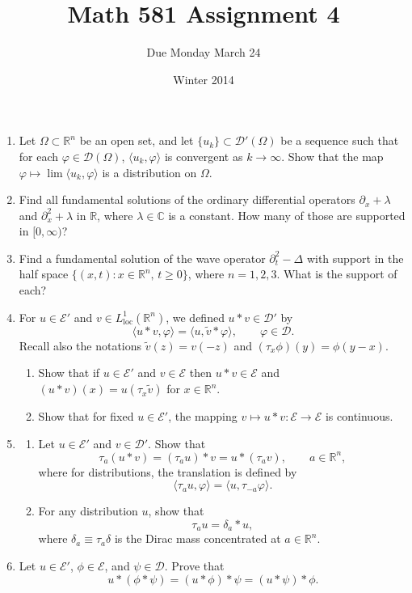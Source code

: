 \documentclass[11pt]{amsart}
\title{Math 581 Assignment 4}
\author{Due Monday March 24}
\date{Winter 2014}                                           %
\newcommand{\R}{\mathbb{R}}
\newcommand{\C}{\mathbb{C}}
\newcommand{\tstD}{\mathscr{D}}
\newcommand{\tstE}{\mathscr{E}}
\begin{document}
\maketitle

\begin{enumerate}[1.]
\item
Let $\Omega\subset\R^n$ be an open set, and let $\{u_k\}\subset\tstD'(\Omega)$ be a sequence
such that for each $\varphi\in\tstD(\Omega)$, $\langle u_k,\varphi\rangle$ is convergent as $k\to\infty$.
Show that the map $\varphi\mapsto\lim\langle u_k,\varphi\rangle$ is a distribution on $\Omega$.
\item
Find all fundamental solutions of the ordinary differential operators 
$\partial_x+\lambda$ and $\partial_x^2+\lambda$ in $\R$, where $\lambda\in\C$ is a constant.
How many of those are supported in $[0,\infty)$?
\item
Find a fundamental solution of the wave operator $\partial_t^2-\Delta$ with support in the half space $\{(x,t):x\in\R^n,\,t\geq0\}$,
where $n=1,2,3$.
What is the support of each?
\item
For $u\in\tstE'$ and $v\in L^1_{\mathrm{loc}}(\R^n)$, we defined $u*v\in\tstD'$ by 
$$
\langle u*v,\varphi\rangle = \langle u,\tilde{v}*\varphi\rangle,
\qquad \varphi\in\tstD.
$$
Recall also the notations $\tilde v(z) = v(-z)$ and $(\tau_x\phi)(y)=\phi(y-x)$.
\begin{enumerate}[{\em a)}]
\item
Show that if $u\in\tstE'$ and $v\in\tstE$ then $u*v\in\tstE$ and $(u*v)(x)=u(\tau_x\tilde v)$ for $x\in\R^n$.
\item
Show that for fixed $u\in\tstE'$, the mapping $v\mapsto u*v:\tstE\to\tstE$ is continuous.
\end{enumerate}
\item
\begin{enumerate}[{\em a)}]
\item
Let $u\in\tstE'$ and $v\in\tstD'$.
Show that
$$
\tau_a(u*v) = (\tau_au)*v = u*(\tau_av),
\qquad a\in\R^n,
$$
where for distributions, the translation is defined by
$$
\langle \tau_au,\varphi\rangle = \langle u,\tau_{-a}\varphi\rangle.
$$
\item
For any distribution $u$, show that 
$$
\tau_au=\delta_a*u,
$$
where $\delta_a\equiv\tau_a\delta$ is the Dirac mass concentrated at $a\in\R^n$.
\end{enumerate}
\item
Let $u\in\tstE'$, $\phi\in\tstE$, and $\psi\in\tstD$. Prove that 
$$
u*(\phi*\psi) = (u*\phi)*\psi = (u*\psi)*\phi.
$$
\end{enumerate}
\end{document}
